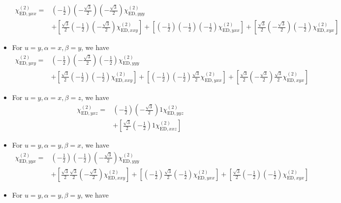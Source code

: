 \documentclass[UTF8,10pt,a4paper]{article}
\begin{document}
\begin{itemize}
\begin{align}
\nonumber\chi_{\text{ED},yxx}^{(2)}=&\left(-\frac{1}{2}\right)\left(-\frac{\sqrt{3}}{2}\right)\left(-\frac{\sqrt{3}}{2}\right)\chi_{\text{ED},yyy}^{(2)}\\
&+\left[\frac{\sqrt{3}}{2}\left(-\frac{1}{2}\right)\left(-\frac{\sqrt{3}}{2}\right)\chi_{\text{ED},xxy}^{(2)}\right]+\left[\left(-\frac{1}{2}\right)\left(-\frac{1}{2}\right)\left(-\frac{1}{2}\right)\chi_{\text{ED},yxx}^{(2)}\right]+\left[\frac{\sqrt{3}}{2}\left(-\frac{\sqrt{3}}{2}\right)\left(-\frac{1}{2}\right)\chi_{\text{ED},xyx}^{(2)}\right]
\end{align}\normalsize
\item For $u=y,\alpha=x,\beta=y$, we have
\small\begin{align}
\nonumber\chi_{\text{ED},yxy}^{(2)}=&\left(-\frac{1}{2}\right)\left(-\frac{\sqrt{3}}{2}\right)\left(-\frac{1}{2}\right)\chi_{\text{ED},yyy}^{(2)}\\
&+\left[\frac{\sqrt{3}}{2}\left(-\frac{1}{2}\right)\left(-\frac{1}{2}\right)\chi_{\text{ED},xxy}^{(2)}\right]+\left[\left(-\frac{1}{2}\right)\left(-\frac{1}{2}\right)\frac{\sqrt{3}}{2}\chi_{\text{ED},yxx}^{(2)}\right]+\left[\frac{\sqrt{3}}{2}\left(-\frac{\sqrt{3}}{2}\right)\frac{\sqrt{3}}{2}\chi_{\text{ED},xyx}^{(2)}\right]
\end{align}\normalsize
\item For $u=y,\alpha=x,\beta=z$, we have
\small\begin{align}
\nonumber\chi_{\text{ED},yxz}^{(2)}=&\left(-\frac{1}{2}\right)\left(-\frac{\sqrt{3}}{2}\right)1\chi_{\text{ED},yyz}^{(2)}\\
&+\left[\frac{\sqrt{3}}{2}\left(-\frac{1}{2}\right)1\chi_{\text{ED},xxz}^{(2)}\right]
\end{align}\normalsize
\item For $u=y,\alpha=y,\beta=x$, we have
\small\begin{align}
\nonumber\chi_{\text{ED},yyx}^{(2)}=&\left(-\frac{1}{2}\right)\left(-\frac{1}{2}\right)\left(-\frac{\sqrt{3}}{2}\right)\chi_{\text{ED},yyy}^{(2)}\\
&+\left[\frac{\sqrt{3}}{2}\frac{\sqrt{3}}{2}\left(-\frac{\sqrt{3}}{2}\right)\chi_{\text{ED},xxy}^{(2)}\right]+\left[\left(-\frac{1}{2}\right)\frac{\sqrt{3}}{2}\left(-\frac{1}{2}\right)\chi_{\text{ED},yxx}^{(2)}\right]+\left[\frac{\sqrt{3}}{2}\left(-\frac{1}{2}\right)\left(-\frac{1}{2}\right)\chi_{\text{ED},xyx}^{(2)}\right]
\end{align}\normalsize
\item For $u=y,\alpha=y,\beta=y$, we have
\small\begin{align}

\end{align}
\end{itemize}
\end{document}
